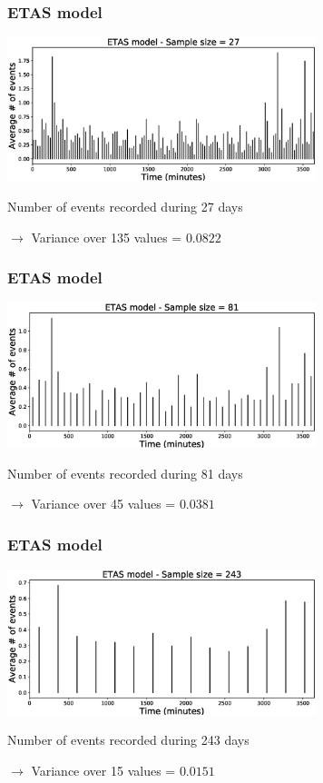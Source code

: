 \documentclass{beamer}
\begin{document}
	\begin{frame}
		\frametitle{ETAS model}
		\begin{center}
			\includegraphics[width=9cm, trim={1cm 0cm 3cm 0cm}, clip]{longrange/ETAS_4.eps}
		\end{center}
		Number of events recorded during 27 days

		$\rightarrow$ Variance over 135 values = $0.0822$
	\end{frame}

	\begin{frame}
		\frametitle{ETAS model}
		\begin{center}
			\includegraphics[width=9cm, trim={1cm 0cm 3cm 0cm}, clip]{longrange/ETAS_5.eps}
		\end{center}
		Number of events recorded during 81 days

		$\rightarrow$ Variance over 45 values = $0.0381$
	\end{frame}

	\begin{frame}
		\frametitle{ETAS model}
		\begin{center}
			\includegraphics[width=9cm, trim={1cm 0cm 3cm 0cm}, clip]{longrange/ETAS_6.eps}
		\end{center}
		Number of events recorded during 243 days

		$\rightarrow$ Variance over 15 values = $0.0151$
	\end{frame}
\end{document}
